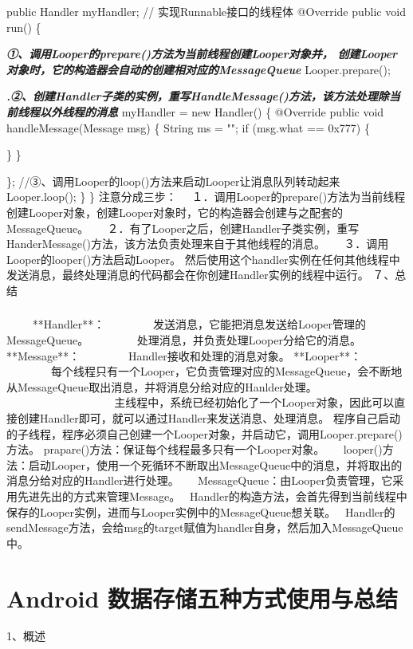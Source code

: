 \documentclass[9pt, b5paper]{article}
\begin{document}
public Handler myHandler;  
// 实现Runnable接口的线程体 
@Override  
public void run() \{  

\emph{\textbf{①、调用Looper的prepare()方法为当前线程创建Looper对象并，
 创建Looper对象时，它的构造器会自动的创建相对应的MessageQueue}}
   Looper.prepare();  

\emph{\textbf{.②、创建Handler子类的实例，重写HandleMessage()方法，该方法处理除当前线程以外线程的消息}}
 myHandler = new Handler() \{  
    @Override  
    public void handleMessage(Message msg) \{  
        String ms = "";  
        if (msg.what == 0x777) \{  

    \}  
\}  


            \};  
            //③、调用Looper的loop()方法来启动Looper让消息队列转动起来
            Looper.loop();  
        \}
    \}
注意分成三步：　
１．调用Looper的prepare()方法为当前线程创建Looper对象，创建Looper对象时，它的构造器会创建与之配套的MessageQueue。 　
２．有了Looper之后，创建Handler子类实例，重写HanderMessage()方法，该方法负责处理来自于其他线程的消息。 　
３．调用Looper的looper()方法启动Looper。
然后使用这个handler实例在任何其他线程中发送消息，最终处理消息的代码都会在你创建Handler实例的线程中运行。
 ７、总结
\subsubsection{}
\label{sec-6-0-7}
  　　
**Handler**： 
　　　　发送消息，它能把消息发送给Looper管理的MessageQueue。 
　　　　处理消息，并负责处理Looper分给它的消息。 
**Message**：
　　　　Handler接收和处理的消息对象。 
**Looper**： 
　　　　每个线程只有一个Looper，它负责管理对应的MessageQueue，会不断地从MessageQueue取出消息，并将消息分给对应的Hanlder处理。 　
　　　　
　　　　主线程中，系统已经初始化了一个Looper对象，因此可以直接创建Handler即可，就可以通过Handler来发送消息、处理消息。 程序自己启动的子线程，程序必须自己创建一个Looper对象，并启动它，调用Looper.prepare()方法。 
prapare()方法：保证每个线程最多只有一个Looper对象。 　
looper()方法：启动Looper，使用一个死循环不断取出MessageQueue中的消息，并将取出的消息分给对应的Handler进行处理。 　
MessageQueue：由Looper负责管理，它采用先进先出的方式来管理Message。　
Handler的构造方法，会首先得到当前线程中保存的Looper实例，进而与Looper实例中的MessageQueue想关联。　
Handler的sendMessage方法，会给msg的target赋值为handler自身，然后加入MessageQueue中。
\section{Android 数据存储五种方式使用与总结}
\label{sec-7}
1、概述
\end{document}
